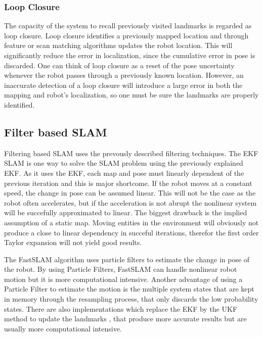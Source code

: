 \subsubsection{Loop Closure}

The capacity of the system to recall previously visited landmarks is regarded as loop closure. Loop closure identifies a previously mapped location and through feature or scan matching algorithms updates the robot location. This will significantly reduce the error in localization, since the cumulative error in pose is discarded. One can think of loop closure as a reset of the pose uncertainty whenever the robot passes through a previously known location. However, an inaccurate detection of a loop closure will introduce a large error in both the mapping and robot's localization, so one must be sure the landmarks are properly identified.

\subsection{Filter based \acs*{SLAM}}

Filtering based \acs*{SLAM} uses the prevously described filtering techniques. The \acs*{EKF} \acs*{SLAM} is one way to solve the \acs*{SLAM} problem using the previously explained \acl*{EKF}. As it uses the \acs*{EKF}, each map and pose must linearly dependent of the previous iteration and this is major shortcome. If the robot moves at a constant speed, the change in pose can be assumed linear. This will not be the case as the robot often accelerates, but if the acceleration is not abrupt the nonlinear system will be succefully approximated to linear. The biggest drawback is the implied assumption of a static map. Moving entities in the environment will obviously not produce a close to linear dependency in succeful iterations, therefor the first order Taylor expansion will not yield good results. 


The FastSLAM algorithm \cite{thrun_fastslam_nodate} uses particle filters to estimate the change in pose of the robot. By using Particle Filters, FastSLAM can handle nonlinear robot motion but it is more computational intensive. Another advantage of using a Particle Filter to estimate the motion is the multiple system states that are kept in memory through the resampling process, that only discards the low probability states. There are also implementations which replace the \acs*{EKF} by the \acs*{UKF} method to update the landmarks \cite{wang_upf-ukf_2007}, that produce more accurate results but are usually more computational intensive.


